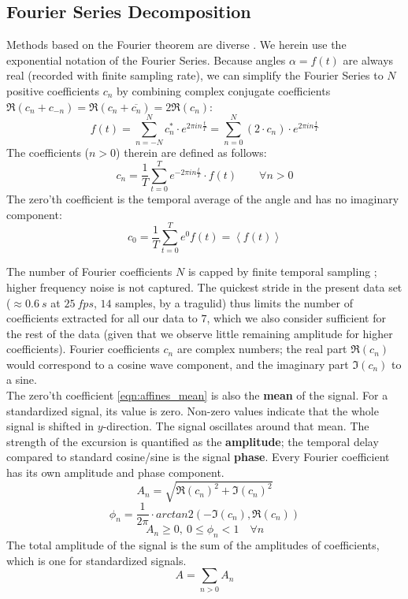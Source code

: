 \documentclass[10pt, a4paper]{article}
\begin{document}
\subsection{Fourier Series Decomposition}\label{apdx:fourier}
Methods based on the Fourier theorem are diverse \citep{Fourier1822,Gray1995,Bracewell2000}. 
We herein use the exponential notation of the Fourier Series. 
Because angles $\alpha =f(t)$ are always real (recorded with finite sampling rate), we can simplify the Fourier Series to $N$ positive coefficients $c_{n}$ by combining complex conjugate coefficients $\Re(c_n + c_{-n}) = \Re(c_n + \overline{c_n}) = 2\Re(c_{n})$:
	\begin{equation}\label{eqn:fourier_series}
	f(t) = \sum\limits_{n=-N}^{N} c^{*}_{n}\cdot e^{2\pi i n \frac{t}{T}} = \sum\limits_{n=0}^{N} (2\cdot c_{n})\cdot e^{2\pi i n \frac{t}{T}}
	\end{equation}
The coefficients ($n>0$) therein are defined as follows:
	\begin{equation}\label{eqn:fourier_coefficients}
	c_{n} = \frac{1}{T}\sum\limits_{t=0}^{T} e^{-2\pi i n \frac{t}{T}} \cdot f(t)  \quad\quad \forall n>0
	\end{equation}
	The zero'th coefficient is the temporal average of the angle and has no imaginary component: %
	\begin{equation}\label{eqn:affines_mean}
	c_{0} = \frac{1}{T}\sum\limits_{t=0}^{T} e^{0} f(t) = \left\langle f(t)  \right\rangle
	\end{equation}

The number of Fourier coefficients $N$ is capped by finite temporal sampling \citep[Nyquist–Shannon sampling theorem,][]{Nyquist1928,Shannon1949}; higher frequency noise is not captured. 
The quickest stride in the present data set ($\approx 0.6\ s$ at $25\ fps$, $14$ samples, by a tragulid) thus limits the number of coefficients extracted for all our data to $7$, which we also consider sufficient for the rest of the data (given that we observe little remaining amplitude for higher coefficients). 
Fourier coefficients $c_{n}$ are complex numbers; the real part $\Re(c_{n})$ would correspond to a cosine wave component, and the imaginary part $\Im(c_{n})$ to a sine. 
\bigskip\\The zero'th coefficient \eqref{eqn:affines_mean} is also the \textbf{mean} of the signal. 
For a standardized signal, its value is zero. 
Non-zero values indicate that the whole signal is shifted in $y$-direction. 
The signal oscillates around that mean. 
The strength of the excursion is quantified as the \textbf{amplitude}; the temporal delay compared to standard cosine/sine is the signal \textbf{phase}. 
Every Fourier coefficient has its own amplitude and phase component. 
$$A_{n} = \sqrt{\Re(c_{n})^{2}+\Im(c_{n})^{2}}$$
$$\phi_{n} = \frac{1}{2\pi}\cdot arctan2\left( -\Im(c_{n}),\Re(c_{n})\right)$$
$$A_{n} \ge 0,\ 0 \le \phi_{n} < 1 \quad \forall n$$
The total amplitude of the signal is the sum of the amplitudes of coefficients, which is one for standardized signals. 
	\begin{equation}\label{eqn:affines_amplitude}
	A = \sum\limits_{n > 0} A_{n}
	\end{equation}
\end{document}

